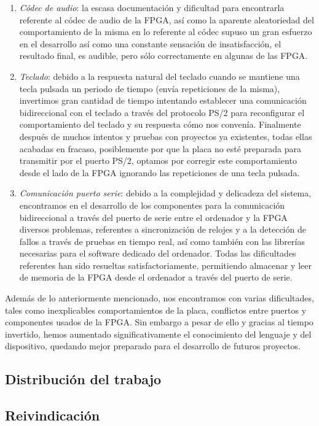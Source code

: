\documentclass{article}
\begin{document}
\begin{enumerate}
	\item {\itshape Códec de audio}: la escasa documentación y dificultad para encontrarla referente al códec de audio de la FPGA, así como la aparente aleatoriedad del comportamiento de la misma en lo referente al códec supuso un gran esfuerzo en el desarrollo así como una constante sensación de insatisfacción, el resultado final, es audible, pero sólo correctamente en algunas de las FPGA.

	\item {\itshape Teclado}: debido a la respuesta natural del teclado cuando se mantiene una tecla pulsada un periodo de tiempo (envía repeticiones de la misma), invertimos gran cantidad de tiempo intentando establecer una comunicación bidireccional con el teclado a través del protocolo PS/2 para reconfigurar el comportamiento del teclado y su respuesta cómo nos convenía. Finalmente después de muchos intentos y pruebas con proyectos ya existentes, todas ellas acabadas en fracaso, posiblemente por que la placa no esté preparada para transmitir por el puerto PS/2, optamos por corregir este comportamiento desde el lado de la FPGA ignorando las repeticiones de una tecla pulsada.

	\item {\itshape Comunicación puerto serie}: debido a la complejidad y delicadeza del sistema, encontramos en el desarrollo de los componentes para la comunicación bidireccional a través del puerto de serie entre el ordenador y la FPGA diversos problemas, referentes a sincronización de relojes y a la detección de fallos a través de pruebas en tiempo real, así como también con las librerías necesarias para el software dedicado del ordenador.
	Todas las dificultades referentes han sido resueltas satisfactoriamente, permitiendo almacenar y leer de memoria de la FPGA desde el ordenador a través del puerto de serie.
\end{enumerate}

Además de lo anteriormente mencionado, nos encontramos con varias dificultades, tales como inexplicables comportamientos de la placa, conflictos entre puertos y componentes usados de la FPGA.
Sin embargo a pesar de ello y gracias al tiempo invertido, hemos aumentado significativamente el conocimiento del lenguaje y del dispositivo, quedando mejor preparado para el desarrollo de futuros proyectos.

\subsection{Distribución del trabajo}

\subsection{Reivindicación}

\newpage
{} {}


\end{document}
